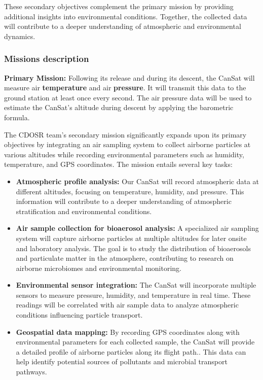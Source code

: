 These secondary objectives complement the primary mission by providing additional insights into environmental conditions. Together, the collected data will contribute to a deeper understanding of atmospheric and environmental dynamics.

\subsubsection{Missions description}

\textbf{Primary Mission:} Following its release and during its descent, the CanSat will measure air \textbf{temperature} and air \textbf{pressure}. It will transmit this data to the ground station at least once every second. The air pressure data will be used to estimate the CanSat’s altitude during descent by applying the barometric formula.

The CDOSR team's secondary mission significantly expands upon its primary objectives by integrating an air sampling system to collect airborne particles at various altitudes while recording environmental parameters such as humidity, temperature, and GPS coordinates. The mission entails several key tasks:

\begin{itemize}[leftmargin=1.27cm, itemindent=0cm, topsep=2pt, label=\faTasks]
    \item {\textbf{Atmospheric profile analysis:}} Our CanSat will record atmospheric data at different altitudes, focusing on temperature, humidity, and pressure. This information will contribute to a deeper understanding of atmospheric stratification and environmental conditions.
    \item {\textbf{Air sample collection for bioaerosol analysis:}} A specialized air sampling system will capture airborne particles at multiple altitudes for later onsite and laboratory analysis. The goal is to study the distribution of bioaerosols and particulate matter in the atmosphere, contributing to research on airborne microbiomes and environmental monitoring.
    \item {\textbf{Environmental sensor integration:}} The CanSat will incorporate multiple sensors to measure pressure, humidity, and temperature in real time. These readings will be correlated with air sample data to analyze atmospheric conditions influencing particle transport.
    \item {\textbf{Geospatial data mapping:}} By recording GPS coordinates along with environmental parameters for each collected sample, the CanSat will provide a detailed profile of airborne particles along its flight path.. This data can help identify potential sources of pollutants and microbial transport pathways.
\end{itemize}

